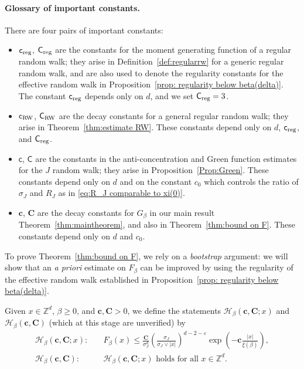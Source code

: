 \documentclass[11pt,a4paper]{article}
\numberwithin{equation}{section}
\theoremstyle{plain}
\theoremstyle{definition}
\newcommand\1{\mathds{1}}
\newcommand\bfc{\mathbf{c}}
\newcommand\bfC{\mathbf{C}}
\newcommand\Crw{\mathsf{C}_{\textup{RW}}}
\newcommand\crw{\mathsf{c}_{\textup{RW}}}
\newcommand\CGreen{\mathsf{C}}
\newcommand\cGreen{\mathsf{c}}
\newcommand\creg{\mathsf{c}_{\textup{reg}}}
\newcommand\Creg{\mathsf{C}_{\textup{reg}}}
\begin{document}
\paragraph{Glossary of important constants.}
There are four pairs of important constants:
\begin{itemize}
\item
$\creg$, $\Creg$ are the constants for the moment generating function of
a regular random walk; they arise in Definition~\ref{def:regularrw}
for a generic regular random walk, and are also used to denote
the regularity constants for the effective random walk
in Proposition~\ref{prop: regularity below beta(delta)}.
The constant $\creg$ depends only on $d$, and
we set $\Creg=3$.
\item
$\crw$, $\Crw$ are the decay constants for a general regular random walk;
they arise in Theorem~\ref{thm:estimate RW}.
These constants depend only on $d$, $\creg$, and $\Creg$.
\item
$\cGreen$, $\CGreen$ are the constants in
the anti-concentration and Green function estimates for the
$J$ random walk; they arise in Proposition~\ref{Prop:Green}.
These constants depend only on $d$ and on the constant $c_0$ which controls the ratio of
$\sigma_J$ and $R_J$ as in \eqref{eq:R_J comparable to xi(0)}.
\item
$\bfc$, $\bfC$ are the decay constants for $G_\beta$ in our main result
Theorem~\ref{thm:maintheorem}, and also in Theorem~\ref{thm:bound on F}.
These constants depend only on
$d$ and $c_0$.
\end{itemize}

To prove Theorem~\ref{thm:bound on F}, we rely on a \emph{bootstrap} argument: we will show that an
{\it a priori} estimate on $F_\beta$ can be improved by using the
regularity of the effective random walk
established in Proposition~\ref{prop: regularity below beta(delta)}.






Given $x\in \mathbb Z^d$, $\beta \ge 0$, and $\bfc,\bfC>0$, we define the statements
$\mathcal H_\beta(\bfc,\bfC;x)$ and $\mathcal H_\beta(\bfc,\bfC)$
(which at this stage are unverified) by
\begin{align}
\label{eq:Hxdef}
	\mathcal H_\beta(\bfc,\bfC;x): &\quad F_{\beta}(x)\leq \frac{\bfC}{\sigma_J^d}\left(\frac{\sigma_J}{\sigma_J\vee|x|}\right)^{d-2-\varepsilon}
\exp\left(-\bfc\frac{|x|}{\xi(\beta)}\right) ,
\\
\label{eq:Hdef}
	\mathcal H_\beta(\bfc,\bfC): &\quad
    \text{$\mathcal H_\beta(\bfc,\bfC;x)$ holds for all $x\in \mathbb Z^d$}.
\end{align}
\end{document}
